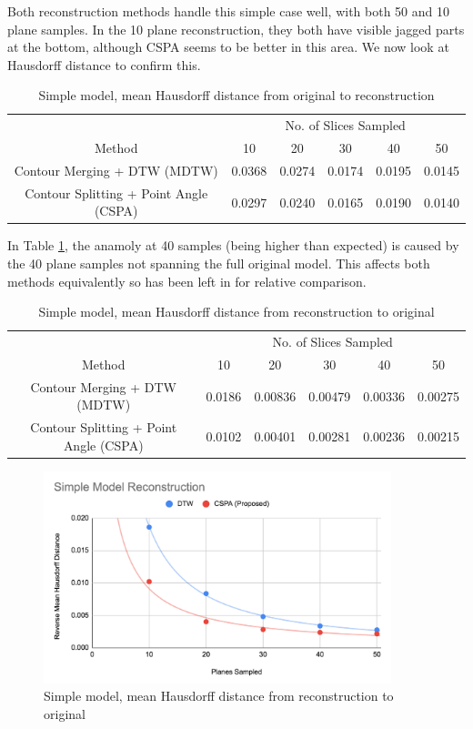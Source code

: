 \documentclass[11p, titlepage]{article}
\begin{document}
Both reconstruction methods handle this simple case well, with both 50 and 10 plane samples. In the 10 plane reconstruction, they both have visible jagged parts at the bottom, although CSPA seems to be better in this area. We now look at Hausdorff distance to confirm this.

\begin{table}[h!]
\begin{tabular}{ | c | c | c | c | c | c | }
\hline
& \multicolumn{5}{c|}{No. of Slices Sampled} \\
\cline{2-6}
Method & 10 & 20 & 30 & 40 & 50 \\
\hline
Contour Merging + DTW (MDTW) & 0.0368 & 0.0274 & 0.0174 & 0.0195 & 0.0145 \\
Contour Splitting + Point Angle (CSPA) & 0.0297 & 0.0240 & 0.0165 & 0.0190 & 0.0140 \\
\hline
\end{tabular}
\caption{Simple model, mean Hausdorff distance from original to reconstruction}
\label{table:simple_forward}
\end{table}

In Table \ref{table:simple_forward}, the anamoly at 40 samples (being higher than expected) is caused by the 40 plane samples not spanning the full original model. This affects both methods equivalently so has been left in for relative comparison.

\begin{table}[h!]
\begin{tabular}{ | c | c | c | c | c | c | }
\hline
& \multicolumn{5}{c|}{No. of Slices Sampled} \\
\cline{2-6}
Method & 10 & 20 & 30 & 40 & 50 \\
\hline
Contour Merging + DTW (MDTW) & 0.0186 & 0.00836 & 0.00479 & 0.00336 & 0.00275 \\
Contour Splitting + Point Angle (CSPA) & 0.0102 & 0.00401 & 0.00281 & 0.00236 & 0.00215 \\
\hline
\end{tabular}
\caption{Simple model, mean Hausdorff distance from reconstruction to original}
\label{table:simple_reverse}
\end{table}

\begin{figure}[h!]
\centering
\includegraphics[width=0.9\textwidth]{graphs/simple-reverse}
\caption{Simple model, mean Hausdorff distance from reconstruction to original\label{fig:simple_reverse_graph}}
\end{figure}
\end{document}
